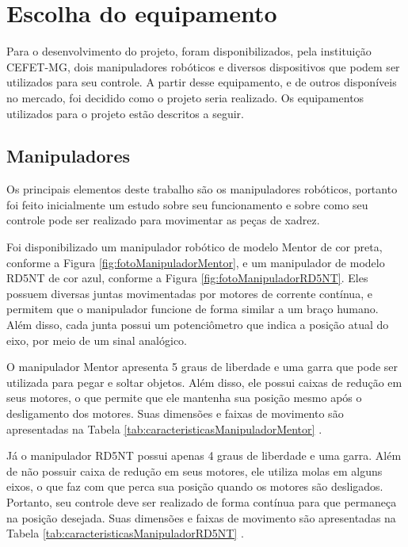\section[Escolha do equipamento]{Escolha do equipamento}
\label{sec:escolhaEquipamento}

Para o desenvolvimento do projeto, foram disponibilizados, pela instituição CEFET-MG, dois manipuladores robóticos e diversos dispositivos que podem ser utilizados para seu controle.
A partir desse equipamento, e de outros disponíveis no mercado, foi decidido como o projeto seria realizado.
Os equipamentos utilizados para o projeto estão descritos a seguir.

\subsection[Manipuladores]{Manipuladores}

Os principais elementos deste trabalho são os manipuladores robóticos, portanto foi feito inicialmente um estudo sobre seu funcionamento e sobre como seu controle pode ser realizado para movimentar as peças de xadrez.

Foi disponibilizado um manipulador robótico de modelo Mentor de cor preta, conforme a Figura \ref{fig:fotoManipuladorMentor}, e um manipulador de modelo RD5NT de cor azul, conforme a Figura \ref{fig:fotoManipuladorRD5NT}.
Eles possuem diversas juntas movimentadas por motores de corrente contínua, e permitem que o manipulador funcione de forma similar a um braço humano.
Além disso, cada junta possui um potenciômetro que indica a posição atual do eixo, por meio de um sinal analógico.

O manipulador Mentor apresenta 5 graus de liberdade e uma garra que pode ser utilizada para pegar e soltar objetos.
Além disso, ele possui caixas de redução em seus motores, o que permite que ele mantenha sua posição mesmo após o desligamento dos motores.
Suas dimensões e faixas de movimento são apresentadas na Tabela \ref{tab:caracteristicasManipuladorMentor} \cite{mentor_forward_kinematics}.

Já o manipulador RD5NT possui apenas 4 graus de liberdade e uma garra.
Além de não possuir caixa de redução em seus motores, ele utiliza molas em alguns eixos, o que faz com que perca sua posição quando os motores são desligados.
Portanto, seu controle deve ser realizado de forma contínua para que permaneça na posição desejada.
Suas dimensões e faixas de movimento são apresentadas na Tabela \ref{tab:caracteristicasManipuladorRD5NT} \cite{controle_neural_robo}.

